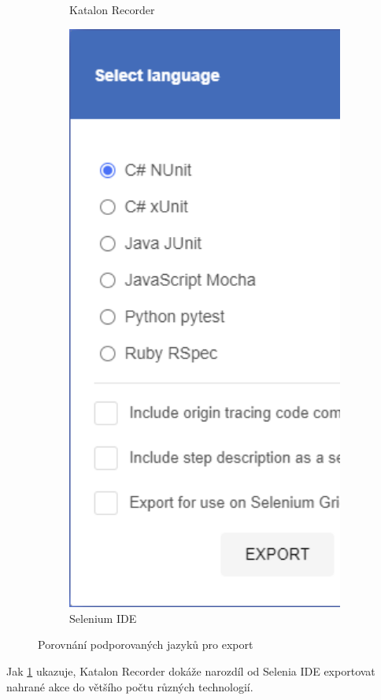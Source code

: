 \documentclass[12pt, a4paper, twoside]{article}
\begin{document}
\begin{figure}[H]
\begin{subfigure}[t]{0.6\textwidth}
			\caption{Katalon Recorder}
		\end{subfigure} \hfill
		\begin{subfigure}[t]{0.37\textwidth}
			\includegraphics[width=1.0\textwidth, center]{seleniumIdeExport.png}
			\caption{Selenium IDE}
		\end{subfigure}
		\caption{Porovnání podporovaných jazyků pro export}
		\label{fig:katalonExportComparison}
	\end{figure}
	Jak \cref{fig:katalonExportComparison} ukazuje, Katalon Recorder dokáže narozdíl od Selenia IDE exportovat nahrané akce do většího počtu různých technologií.
	
\end{document}
